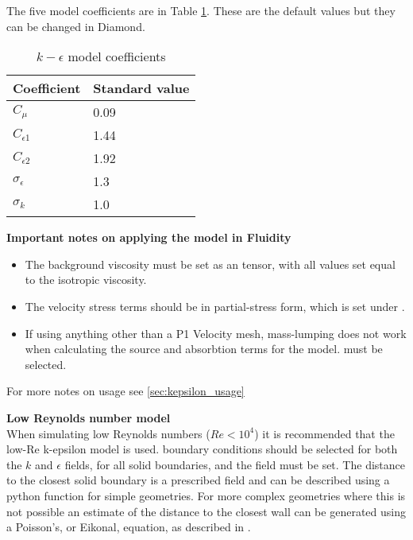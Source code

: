 

The five model coefficients are in Table \ref{tab:kepsco}. These are the default values but they can be changed in Diamond.

\begin{table}[hb]
\begin{center}
\begin{tabular}{ll}\hline
Coefficient & Standard value \\ \hline
$C_\mu$ & 0.09 \\
$C_{\epsilon1}$ & 1.44 \\
$C_{\epsilon2}$ & 1.92 \\
$\sigma_\epsilon$ & 1.3 \\
$\sigma_k$ & 1.0 \\ \hline
\end{tabular}
\end{center}
\caption{$k-\epsilon$ model coefficients}
\label{tab:kepsco}
\end{table}

\par{\textbf{Important notes on applying the model in Fluidity}}
\begin{itemize}
\item The background viscosity must be set as an  tensor, with all values set equal to the isotropic viscosity.
\item The velocity stress terms should be in partial-stress form, which is set under .
\item If using anything other than a P1 Velocity mesh, mass-lumping does not work when calculating the source and absorbtion terms for the model.  must be selected.
\end{itemize}

For more notes on usage see \ref{sec:kepsilon_usage}

\par{\textbf{Low Reynolds number model}\\}
When simulating low Reynolds numbers ($Re<10^4$) it is recommended that the low-Re k-epsilon model is used.  boundary conditions should be selected for both the $k$ and $\epsilon$ fields, for all solid boundaries, and the  field must be set. The distance to the closest solid boundary is a prescribed field and can be described using a python function for simple geometries. For more complex geometries where this is not possible an estimate of the distance to the closest wall can be generated using a Poisson's, or Eikonal, equation, as described in \citet{Tucker2011}. 

